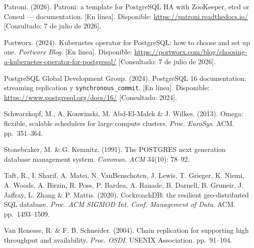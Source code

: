 \documentclass[12pt,twocolumn,letterpaper]{article}
\begin{document}
Patroni. (2026). Patroni: a template for PostgreSQL HA with ZooKeeper, etcd or Consul --- documentation. [En línea]. Disponible: \url{https://patroni.readthedocs.io/} [Consultado: 7 de julio de 2026].\par
Portworx. (2024). Kubernetes operator for PostgreSQL: how to choose and set up one. \textit{Portworx Blog}. [En línea]. Disponible: \url{https://portworx.com/blog/choosing-a-kubernetes-operator-for-postgresql/} [Consultado: 7 de julio de 2026].\par
PostgreSQL Global Development Group. (2024). PostgreSQL 16 documentation: streaming replication y \texttt{synchronous\_commit}. [En línea]. Disponible: \url{https://www.postgresql.org/docs/16/} [Consultado: 2024].\par
Schwarzkopf, M., A. Konwinski, M. Abd-El-Malek \& J. Wilkes. (2013). Omega: flexible, scalable schedulers for large compute clusters. \textit{Proc. EuroSys}. ACM. pp.~351--364.\par
Stonebraker, M. \& G. Kemnitz. (1991). The POSTGRES next generation database management system. \textit{Commun. ACM} 34(10): 78--92.\par
Taft, R., I. Sharif, A. Matei, N. VanBenschoten, J. Lewis, T. Grieger, K. Niemi, A. Woods, A. Birzin, R. Poss, P. Bardea, A. Ranade, B. Darnell, B. Gruneir, J. Jaffray, L. Zhang \& P. Mattis. (2020). CockroachDB: the resilient geo-distributed SQL database. \textit{Proc. ACM SIGMOD Int. Conf. Management of Data}. ACM. pp.~1493--1509.\par
Van Renesse, R. \& F. B. Schneider. (2004). Chain replication for supporting high throughput and availability. \textit{Proc. OSDI}. USENIX Association. pp.~91--104.\par
\endgroup
\end{document}
